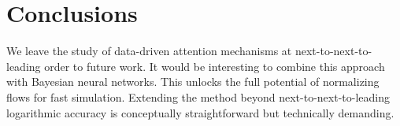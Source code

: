 \section{Conclusions}\label{sec:conclusions}

We leave the study of data-driven attention mechanisms at
next-to-next-to-leading order to future work. It would be interesting to
combine this approach with Bayesian neural networks. This unlocks the
full potential of normalizing flows for fast simulation. Extending the
method beyond next-to-next-to-leading logarithmic accuracy is
conceptually straightforward but technically demanding.

